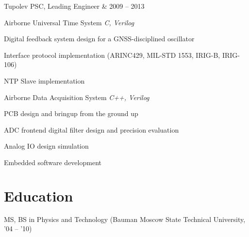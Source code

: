 \documentclass[a4paper]{scrartcl}
\begin{document}
\begin{list1}
\begin{list2}
  \end{list2}

\vspace{10pt}

\item \begin{tabular1bold} Tupolev PSC, Leading Engineer & 2009 -- 2013 \end{tabular1bold}



  \begin{list2}
  \item Airborne Universal Time System \hfill \emph{C, Verilog}

    \begin{list3}
      \item Digital feedback system design for a GNSS-disciplined oscillator
      \item Interface protocol implementation (ARINC429, MIL-STD 1553, IRIG-B, IRIG-106)
      \item NTP Slave implementation
    \end{list3}

  \end{list2}


  \begin{list2}
  \item Airborne Data Acquisition System \hfill \emph{C++, Verilog} 

    \begin{list3}
    \item PCB design and bringup from the ground up
    \item ADC frontend digital filter design and precision evaluation
    \item Analog IO design simulation
    \item Embedded software development
    \end{list3}

  \end{list2}


\end{list1}
\vspace{10pt}


\section*{Education}
\begin{list1}
\item
  \begin{tabular1bold} MS, BS in Physics and Technology (Bauman Moscow State Technical University, '04 -- '10)
    \end{tabular1bold}
\end{list1}
\end{document}
